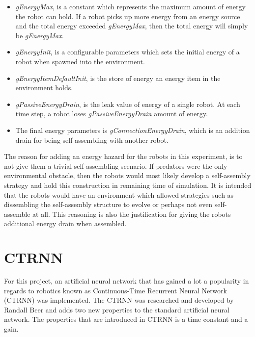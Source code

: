 \begin{itemize}

\item \emph{gEnergyMax}, is a constant which represents the maximum amount of energy the robot can hold.
If a robot picks up more energy from an energy source and the total energy exceeded \emph{gEnergyMax}, then the total energy will simply be \emph{gEnergyMax}.

\item \emph{gEnergyInit}, is a configurable parameters which sets the initial energy of a robot when spawned into the environment.

\item \emph{gEnergyItemDefaultInit}, is the store of energy an energy item in the environment holds.

\item \emph{gPassiveEnergyDrain}, is the leak value of energy of a single robot. At each time step, a robot loses \emph{gPassiveEnergyDrain} amount of energy.

\item The final energy parameters is \emph{gConnectionEnergyDrain}, which is an addition drain for being self-assembling with another robot.


\end{itemize}


The reason for adding an energy hazard for the robots in this experiment, is to not give them a trivial self-assembling scenario.
If predators were the only environmental obstacle, then the robots would most likely develop a self-assembly strategy and hold this construction in remaining time of simulation.
It is intended that the robots would have an environment which allowed strategies such as dissembling the self-assembly structure to evolve or perhaps not even self-assemble at all.
This reasoning is also the justification for giving the robots additional energy drain when assembled.

\section{CTRNN}
For this project, an artificial neural network that has gained a lot a popularity in regards to robotics known as Continuous-Time Recurrent Neural Network (CTRNN) was implemented. 
The CTRNN was researched and developed by Randall Beer and adds two new properties to the standard artificial neural network. 
The properties that are introduced in CTRNN is a time constant and a gain.

